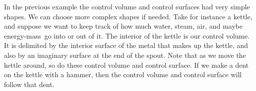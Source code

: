 \documentclass[a4paper,12pt,%
onecolumn,oneside,%
british%
]{memoir}
\renewcommand*{\|}[1][]{\nonscript\:#1\vert\nonscript\:\mathopen{}}
\newcommand*{\energym}{energy-mass}
\begin{document}
%
%
In the previous example the control volume and control surfaces had very simple shapes. We can choose more complex shapes if needed. Take for instance a kettle, and suppose we want to keep track of how much water, steam, air, and maybe \energym\ go into or out of it. The interior of the kettle is our control volume. It is delimited by the interior surface of the metal that makes up the kettle, and also by an imaginary surface at the end of the spout. Note that as we move the kettle around, so do these control volume and control surface. If we make a dent on the kettle with a hammer, then the control volume and control surface will follow that dent.
\end{document}
